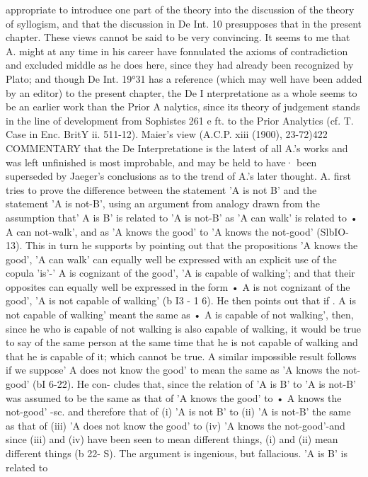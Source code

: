 {{{{{{{{{{{{{{{{{{{{{{{{{{{{{{{{{{{{appropriate to introduce one part of the theory into the discussion
of the theory of syllogism, and that the discussion in De Int. 10
presupposes that in the present chapter.
These views cannot be said to be very convincing. It seems to
me that A. might at any time in his career have fonnulated the
axioms of contradiction and excluded middle as he does here,
since they had already been recognized by Plato; and though
De Int. 19°31 has a reference (which may well have been added
by an editor) to the present chapter, the De I nterpretatione as
a whole seems to be an earlier work than the Prior A nalytics,
since its theory of judgement stands in the line of development
from Sophistes 261 e ft. to the Prior Analytics (cf. T. Case in
Enc. BritY ii. 511-12). Maier's view (A.C.P. xiii (1900), 23-72)422
COMMENTARY
that the De Interpretatione is the latest of all A.'s works and was
left unfinished is most improbable, and may be held to have·
been superseded by Jaeger's conclusions as to the trend of A.'s
later thought.
A. first tries to prove the difference between the statement
'A is not B' and the statement 'A is not-B', using an argument
from analogy drawn from the assumption that' A is B' is related
to 'A is not-B' as 'A can walk' is related to • A can not-walk',
and as 'A knows the good' to 'A knows the not-good' (SlbIO-13).
This in turn he supports by pointing out that the propositions
'A knows the good', 'A can walk' can equally well be expressed
with an explicit use of the copula 'is'-' A is cognizant of the
good', 'A is capable of walking'; and that their opposites can
equally well be expressed in the form • A is not cognizant of the
good', 'A is not capable of walking' (b I3 - 1 6). He then points out
that if . A is not capable of walking' meant the same as • A is
capable of not walking', then, since he who is capable of not
walking is also capable of walking, it would be true to say of the
same person at the same time that he is not capable of walking
and that he is capable of it; which cannot be true. A similar
impossible result follows if we suppose' A does not know the good'
to mean the same as 'A knows the not-good' (bI 6-22). He con-
cludes that, since the relation of 'A is B' to 'A is not-B' was
assumed to be the same as that of 'A knows the good' to • A knows
the not-good' -sc. and therefore that of (i) 'A is not B' to (ii)
'A is not-B' the same as that of (iii) 'A does not know the good' to
(iv) 'A knows the not-good'-and since (iii) and (iv) have been seen
to mean different things, (i) and (ii) mean different things (b 22- S).
The argument is ingenious, but fallacious. 'A is B' is related to
}}}}}}}}}}}}}}}}}}}}}}}}}}}}}}}}}}}}

